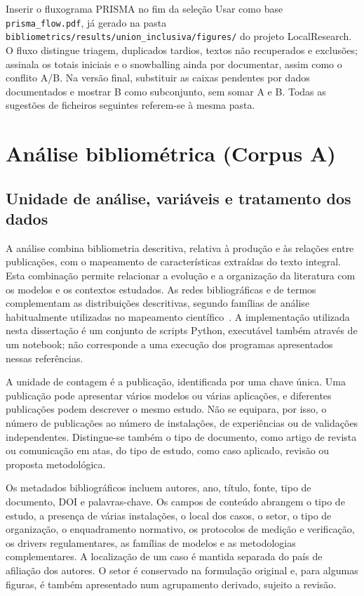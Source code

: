 {Inserir o fluxograma PRISMA no fim da seleção}
{Usar como base \texttt{prisma\_flow.pdf}, já gerado na pasta
\nolinkurl{bibliometrics/results/union_inclusiva/figures/} do projeto
LocalResearch. O fluxo distingue triagem, duplicados tardios, textos
não recuperados e exclusões; assinala os totais iniciais e o
snowballing ainda por documentar, assim como o conflito A/B. Na
versão final, substituir as caixas pendentes por dados documentados
e mostrar B como subconjunto, sem somar A e B. Todas as sugestões
de ficheiros seguintes referem-se à mesma pasta.}%


\section{Análise bibliométrica (Corpus A)}
\label{sec:corpus-a}

\subsection{Unidade de análise, variáveis e tratamento dos dados}

A análise combina bibliometria descritiva, relativa à produção e às
relações entre publicações, com o mapeamento de características extraídas
do texto integral. Esta combinação permite relacionar a evolução e a
organização da literatura com os modelos e os contextos estudados.
As redes bibliográficas e de termos complementam as distribuições
descritivas, segundo famílias de análise habitualmente utilizadas no
mapeamento científico~\cite{Aria2017Bibliometrix,VanEck2010VOSviewer}.
A implementação utilizada nesta dissertação é um conjunto de scripts
Python, executável também através de um notebook; não corresponde a
uma execução dos programas apresentados nessas referências.

A unidade de contagem é a publicação, identificada por uma chave única.
Uma publicação pode apresentar vários modelos ou várias aplicações,
e diferentes publicações podem descrever o mesmo estudo. Não se
equipara, por isso, o número de publicações ao número de instalações,
de experiências ou de validações independentes. Distingue-se também
o tipo de documento, como artigo de revista ou comunicação em atas,
do tipo de estudo, como caso aplicado, revisão ou proposta metodológica.

Os metadados bibliográficos incluem autores, ano, título, fonte,
tipo de documento, DOI e palavras-chave. Os campos de conteúdo
abrangem o tipo de estudo, a presença de várias instalações, o local
dos casos, o setor, o tipo de organização, o enquadramento normativo,
os protocolos de medição e verificação, os drivers regulamentares,
as famílias de modelos e as metodologias complementares. A localização
de um caso é mantida separada do país de afiliação dos autores.
O setor é conservado na formulação original e, para algumas figuras,
é também apresentado num agrupamento derivado, sujeito a revisão.

